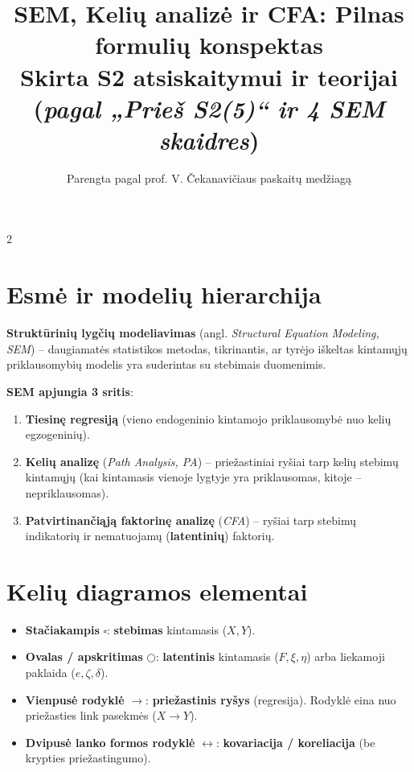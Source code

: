 \documentclass[9pt,a4paper]{article}
\title{\vspace{-1.2cm}\Large\textbf{SEM, Kelių analizė ir CFA: Pilnas formulių konspektas}\\\large Skirta S2 atsiskaitymui ir teorijai (\textit{pagal „Prieš S2(5)“ ir 4 SEM skaidres})\vspace{-0.5cm}}
\author{Parengta pagal prof. V. Čekanavičiaus paskaitų medžiagą}
\date{}
\begin{document}
\maketitle
\thispagestyle{fancy}

\begin{multicols*}{2}

\section{Esmė ir modelių hierarchija}
\textbf{Struktūrinių lygčių modeliavimas} (angl. \textit{Structural Equation Modeling, SEM}) -- daugiamatės statistikos metodas, tikrinantis, ar tyrėjo iškeltas kintamųjų priklausomybių modelis yra suderintas su stebimais duomenimis.

\textbf{SEM apjungia 3 sritis}:
\begin{enumerate}
    \item \textbf{Tiesinę regresiją} (vieno endogeninio kintamojo priklausomybė nuo kelių egzogeninių).
    \item \textbf{Kelių analizę} (\textit{Path Analysis, PA}) -- priežastiniai ryšiai tarp kelių stebimų kintamųjų (kai kintamasis vienoje lygtyje yra priklausomas, kitoje -- nepriklausomas).
    \item \textbf{Patvirtinančiąją faktorinę analizę} (\textit{CFA}) -- ryšiai tarp stebimų indikatorių ir nematuojamų (\textbf{latentinių}) faktorių.
\end{enumerate}

\section{Kelių diagramos elementai}
\begin{itemize}
    \item \textbf{Stačiakampis} $\square$: \textbf{stebimas} kintamasis ($X, Y$).
    \item \textbf{Ovalas / apskritimas} $\bigcirc$: \textbf{latentinis} kintamasis ($F, \xi, \eta$) arba liekamoji paklaida ($e, \zeta, \delta$).
    \item \textbf{Vienpusė rodyklė} $\longrightarrow$: \textbf{priežastinis ryšys} (regresija). Rodyklė eina nuo priežasties link pasekmės ($X \to Y$).
    \item \textbf{Dvipusė lanko formos rodyklė} $\longleftrightarrow$: \textbf{kovariacija / koreliacija} (be krypties priežastingumo).
\end{itemize}


\end{multicols*}
\end{document}
